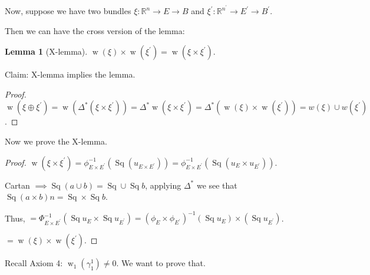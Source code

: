 \documentclass{article}
\theoremstyle{definition}
\newtheorem{lemma}[theorem]{Lemma}
\begin{document}
    Now, suppose we have two bundles \(\xi: \mathbb{R}^n \to E \to B\) and \(\xi^{\prime}: \mathbb{R}^{n^{\prime}} \to E^{\prime} \to B^{\prime}\).
    
    Then we can have the cross version of the lemma:

    \begin{lemma}[X-lemma]
        \(\operatorname{w} (\xi) \times \operatorname{w} (\xi^{\prime}) = \operatorname{w} (\xi \times \xi^{\prime})\).
    \end{lemma}

    Claim: X-lemma implies the lemma.

    \begin{proof}
        \(\operatorname{w} (\xi \oplus \xi^{\prime}) = \operatorname{w} (\Delta^{\ast} (\xi \times \xi^{\prime})) = \Delta^{\ast} \operatorname{w} (\xi \times \xi^{\prime}) = \Delta^{\ast} (\operatorname{w} (\xi) \times \operatorname{w} (\xi^{\prime})) = w(\xi) \cup w(\xi^{\prime})\).
    \end{proof}

    Now we prove the X-lemma.

    \begin{proof}
        \(\operatorname{w} (\xi \times \xi^{\prime}) = \phi_{E \times E^{\prime}}^{-1} (\operatorname{Sq}(u_{E \times E^{\prime}})) = \phi_{E \times E^{\prime}}^{-1} (\operatorname{Sq}(u_E \times u_{E^{\prime}}))\).
        
        Cartan \(\implies \operatorname{Sq} (a \cup b) = \operatorname{Sq} \cup \operatorname{Sq} b\), applying \(\Delta^{\ast}\) we see that \(\operatorname{Sq} (a \times b)n = \operatorname{Sq} \times \operatorname{Sq} b\).

        Thus, \(= \Phi^{-1} _{E \times E^{\prime}} (\operatorname{Sq} u_E \times \operatorname{Sq} u_{E^{\prime}}) = (\phi_E \times \phi_{E^{\prime}})^{-1} (\operatorname{Sq} u_E) \times (\operatorname{Sq} u_{E^{\prime}})\).
        
        \(= \operatorname{w} (\xi) \times \operatorname{w} (\xi^{\prime})\).
    \end{proof}

    Recall Axiom 4: \(\operatorname{w}_1(\gamma^1_1) \neq 0\). We want to prove that.
\end{document}
